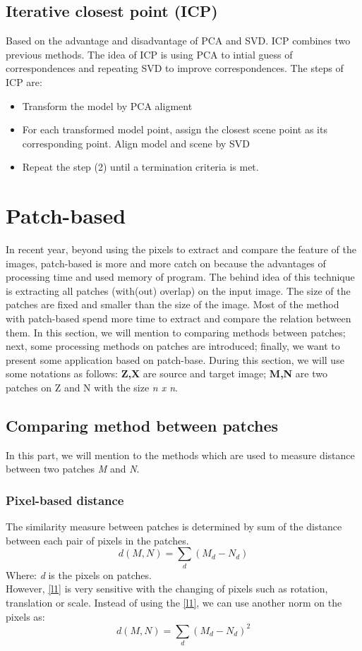 \subsection{Iterative closest point (ICP)}
Based on the advantage and disadvantage of PCA and SVD. ICP combines two previous methods. The idea of ICP is using PCA to intial guess of correspondences and repeating SVD to improve correspondences. The steps of ICP are:
\begin{itemize}
	\item Transform the model by PCA aligment
	\item For each transformed model point, assign the closest scene point as its corresponding point. Align model and scene by SVD
	\item Repeat the step (2) until a termination criteria is met.
\end{itemize}
\section{Patch-based}
In recent year, beyond using the pixels to extract and compare the feature of the images, patch-based is more and more catch on because the advantages of processing time and used memory of program. The behind idea of this technique is extracting all patches (with(out) overlap) on the input image. The size of the patches are fixed and smaller than the size of the image. Most of the method with patch-based spend more time to extract and compare the relation between them. In this section, we will mention to comparing methods between patches; next, some processing methods on patches are introduced; finally, we want to present some application based on patch-base. During this section, we will use some notations as follows: \textbf{Z,X} are source and target image; \textbf{M,N} are two patches on Z and N with the size \textit{n x n}.
\subsection{Comparing method between patches}
In this part, we will mention to the methods which are used to measure distance between two patches \textit{M} and \textit{N}.
\subsubsection{Pixel-based distance}
The similarity measure between patches is determined by sum of the distance between each pair of pixels in the patches.
\begin{equation}\label{l1}
	d(M,N) = \sum_d(M_d - N_d)
\end{equation}
Where: \textit{d} is the pixels on patches.\\[0.2cm]
However, \ref{l1} is very sensitive with the changing of pixels such as rotation, translation or scale. Instead of using the \ref{l1}, we can use another norm on the pixels as:
\begin{equation}\label{l2}
	d(M,N) = \sum_d(M_d - N_d)^2
\end{equation}
